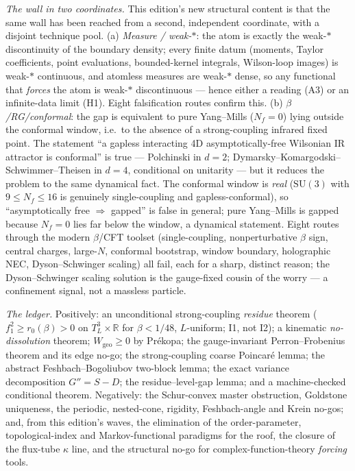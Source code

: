 \documentclass[11pt,a4paper]{article}
\begin{document}
\begin{tcolorbox}[enhanced, breakable, colback=white, colframe=white, boxrule=0pt,
  left=6pt, right=6pt, top=4pt, bottom=4pt, parbox=false]
\emph{The wall in two coordinates.} This edition's new structural content is that the same wall
has been reached from a second, independent coordinate, with a disjoint technique pool.
(a) \emph{Measure / weak-$*$}: the atom is exactly the weak-$*$ discontinuity of the boundary
density; every finite datum (moments, Taylor coefficients, point evaluations, bounded-kernel
integrals, Wilson-loop images) is weak-$*$ continuous, and atomless measures are weak-$*$ dense,
so any functional that \emph{forces} the atom is weak-$*$ discontinuous --- hence either a
reading (A3) or an infinite-data limit (H1). Eight falsification routes confirm this. (b)
\emph{$\beta$/RG/conformal}: the gap is equivalent to pure Yang--Mills ($N_f=0$) lying outside
the conformal window, i.e.\ to the absence of a strong-coupling infrared fixed point. The
statement ``a gapless interacting 4D asymptotically-free Wilsonian IR attractor is conformal''
is true --- Polchinski in $d=2$; Dymarsky--Komargodski--Schwimmer--Theisen in $d=4$, conditional
on unitarity --- but it reduces the problem to the same dynamical fact. The conformal window is
\emph{real} ($\mathrm{SU}(3)$ with $9\le N_f\le16$ is genuinely single-coupling and
gapless-conformal), so ``asymptotically free $\Rightarrow$ gapped'' is false in general; pure
Yang--Mills is gapped because $N_f=0$ lies far below the window, a dynamical statement. Eight
routes through the modern $\beta$/CFT toolset (single-coupling, nonperturbative $\beta$ sign,
central charges, large-$N$, conformal bootstrap, window boundary, holographic NEC, Dyson--Schwinger
scaling) all fail, each for a sharp, distinct reason; the Dyson--Schwinger scaling solution is the
gauge-fixed cousin of the worry --- a confinement signal, not a massless particle.

\emph{The ledger.} Positively: an unconditional strong-coupling \emph{residue} theorem
($f_1^2\ge r_0(\beta)>0$ on $T^3_L\times\mathbb R$ for $\beta<1/48$, $L$-uniform; I1, not I2);
a kinematic \emph{no-dissolution} theorem; $W_{\mathrm{geo}}\ge0$ by Pr\'ekopa; the
gauge-invariant Perron--Frobenius theorem and its edge no-go; the strong-coupling coarse
Poincar\'e lemma; the abstract Feshbach--Bogoliubov two-block lemma; the exact variance
decomposition $G''=S-D$; the residue--level-gap lemma; and a machine-checked conditional theorem.
Negatively: the Schur-convex master obstruction, Goldstone uniqueness, the periodic, nested-cone,
rigidity, Feshbach-angle and Krein no-gos; and, from this edition's waves, the elimination of the
order-parameter, topological-index and Markov-functional paradigms for the roof, the closure of
the flux-tube $\kappa$ line, and the structural no-go for complex-function-theory \emph{forcing}
tools.


\end{tcolorbox}
\end{document}
